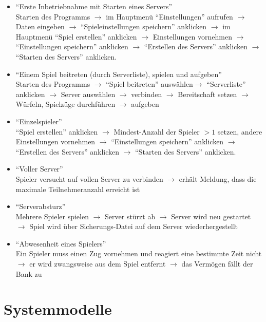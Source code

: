 \documentclass[a4paper,10pt]{article}
\begin{document}
\begin{itemize}
\item ``Erste Inbetriebnahme mit Starten eines Servers'' \\
Starten des Programms $\rightarrow$ im Hauptmenü ``Einstellungen'' aufrufen $\rightarrow$ Daten eingeben $\rightarrow$ ``Spieleinstellungen speichern'' anklicken $\rightarrow$ im Hauptmenü ``Spiel erstellen'' anklicken $\rightarrow$ Einstellungen vornehmen $\rightarrow$ ``Einstellungen speichern'' anklicken $\rightarrow$ ``Erstellen des Servers'' anklicken $\rightarrow$ ``Starten des Servers'' anklicken.
\item ``Einem Spiel beitreten (durch Serverliste), spielen und aufgeben'' \\
Starten des Programms $\rightarrow$ ``Spiel beitreten'' auswählen$\rightarrow$ ``Serverliste'' anklicken $\rightarrow$ Server auswählen $\rightarrow$ verbinden $\rightarrow$ Bereitschaft setzen $\rightarrow$ Würfeln, Spielzüge durchführen $\rightarrow$ aufgeben
\item ``Einzelspieler'' \\
``Spiel erstellen'' anklicken $\rightarrow$ Mindest-Anzahl der Spieler $>1$ setzen, andere Einstellungen vornehmen $\rightarrow$ ``Einstellungen speichern'' anklicken $\rightarrow$ ``Erstellen des Servers'' anklicken $\rightarrow$ ``Starten des Servers'' anklicken.
\item ``Voller Server'' \\
Spieler versucht auf vollen Server zu verbinden $\rightarrow$ erhält Meldung, dass die maximale Teilnehmeranzahl erreicht ist
\item ``Serverabsturz'' \\
Mehrere Spieler spielen $\rightarrow$ Server stürzt ab $\rightarrow$ Server wird neu gestartet $\rightarrow$ Spiel wird über Sicherungs-Datei auf dem Server wiederhergestellt
\item ``Abwesenheit eines Spielers'' \\
Ein Spieler muss einen Zug vornehmen und reagiert eine bestimmte Zeit nicht $\rightarrow$ er wird zwangsweise aus dem Spiel entfernt $\rightarrow$ das Vermögen fällt der Bank zu
\end{itemize}

\section{Systemmodelle}
\end{document}
